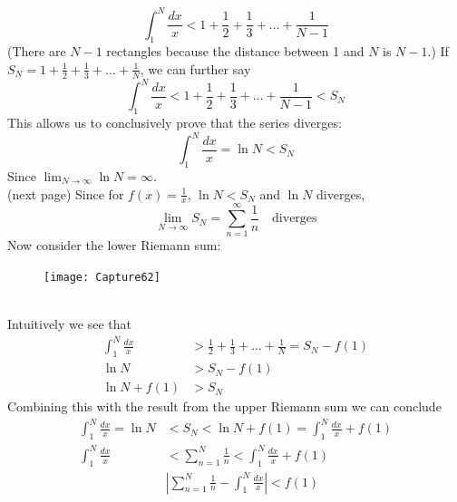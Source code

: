 \documentclass{report}
\begin{document}
\begin{equation*}
\int^N_1\frac{dx}{x}<1+\frac{1}{2}+\frac{1}{3}+\ldots+\frac{1}{N-1}
\end{equation*}
(There are $N-1$ rectangles because the distance between 1 and $N$ is $N-1$.) If $S_N=1+\frac{1}{2}+\frac{1}{3}+\ldots+\frac{1}{N}$, we can further say
\begin{equation*}
\int^N_1\frac{dx}{x}<1+\frac{1}{2}+\frac{1}{3}+\ldots+\frac{1}{N-1}<S_N
\end{equation*}
This allows us to conclusively prove that the series diverges:
\begin{equation*}
\int^N_1\frac{dx}{x}=\ln N<S_N
\end{equation*}
Since $\lim_{N\to\infty}\ln N=\infty$.\\
(next page)
\newpage
\noindent Since for $f(x)=\frac{1}{x}$, $\ln N<S_N$ and $\ln N$ diverges, 
\begin{equation*}
\lim_{N\to\infty}S_N=\sum_{n=1}^\infty\frac{1}{n}\quad\text{diverges}
\end{equation*}
Now consider the lower Riemann sum:
\begin{figure}[h]
\texttt{[image: Capture62]}\\
\centering
{}
\end{figure}\\
Intuitively we see that
\begin{align*}
\int^N_1\frac{dx}{x}&>\frac{1}{2}+\frac{1}{3}+\ldots+\frac{1}{N}=S_N-f(1)\\
\ln N&>S_N-f(1)\\
\ln N+f(1)&>S_N
\end{align*}
Combining this with the result from the upper Riemann sum we can conclude
\begin{align*}
\int^N_1\frac{dx}{x}=\ln N&<S_N<\ln N+f(1)=\int^N_1\frac{dx}{x}+f(1)\\
\int^N_1\frac{dx}{x}&<\sum_{n=1}^N\frac{1}{n}<\int^N_1\frac{dx}{x}+f(1)\\
&\left|\sum_{n=1}^N\frac{1}{n}-\int^N_1\frac{dx}{x}\right|<f(1)
\end{align*}
\newpage
\end{document}
